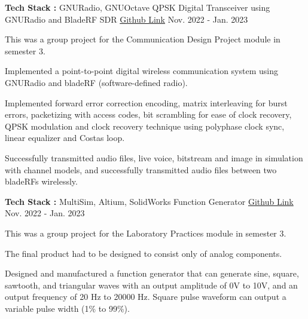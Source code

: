\begin{cventries}
\cventry
{\textbf{Tech Stack :} GNURadio, GNUOctave} %
{QPSK Digital Transceiver using GNURadio and BladeRF SDR} %
{\href{https://github.com/VijthanKurrshanth/QPSK-Tranciever-GnuRadio}{Github Link}} %
{Nov. 2022 - Jan. 2023} %
{ %
\begin{cvitems}
\item {This was a group project for the Communication Design Project module in semester 3.}
\item {Implemented a point-to-point digital wireless communication system using GNURadio and bladeRF (software-defined radio).}
\item {Implemented forward error correction encoding, matrix interleaving for burst errors, packetizing with access codes, bit scrambling for ease of clock recovery, QPSK modulation and clock recovery technique using polyphase clock sync, linear equalizer and Costas loop.} 
\item {Successfully transmitted audio files, live voice, bitstream and image in simulation with channel models, and successfully transmitted audio files between two bladeRFs wirelessly.}
\end{cvitems}
}


\cventry
{\textbf{Tech Stack :} MultiSim, Altium, SolidWorks} %
{Function Generator} %
{\href{https://github.com/VijthanKurrshanth/Function_Generator}{Github Link}} %
{Nov. 2022 - Jan. 2023} %
{ %
\begin{cvitems}
\item {This was a group project for the Laboratory Practices module in semester 3.}
\item {The final product had to be designed to consist only of analog components.}
\item {Designed and manufactured a function generator that can generate sine, square, sawtooth, and triangular waves with an output amplitude of 0V to 10V, and an output frequency of 20 Hz to 20000 Hz. Square pulse waveform can output a variable pulse width (1\% to 99\%).}
\end{cvitems}
}


\end{cventries}
